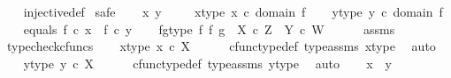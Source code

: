 \begin{isabellebody}
%
\isadelimproof
\ \ %
\endisadelimproof
%
\isatagproof
{}\isamarkupfalse%
\ injective{\isacharunderscore}{\kern0pt}def\isanewline
{}\isamarkupfalse%
\ safe\isanewline
\ \ \isamarkupfalse%
\ x\ y\ \isanewline
\ \ \isamarkupfalse%
\ x{\isacharunderscore}{\kern0pt}type{\isacharcolon}{\kern0pt}\ {\isachardoublequoteopen}x\ {\isasymin}\isactrlsub c\ domain\ f{\isachardoublequoteclose}\isanewline
\ \ \isamarkupfalse%
\ y{\isacharunderscore}{\kern0pt}type{\isacharcolon}{\kern0pt}\ {\isachardoublequoteopen}y\ {\isasymin}\isactrlsub c\ domain\ f{\isachardoublequoteclose}\isanewline
\ \ \isamarkupfalse%
\ equals{\isacharcolon}{\kern0pt}\ {\isachardoublequoteopen}f\ {\isasymcirc}\isactrlsub c\ x\ {\isacharequal}{\kern0pt}\ f\ {\isasymcirc}\isactrlsub c\ y{\isachardoublequoteclose}\isanewline
\ \ \isamarkupfalse%
\ fg{\isacharunderscore}{\kern0pt}type{\isacharcolon}{\kern0pt}\ {\isachardoublequoteopen}f\ {\isasymtimes}\isactrlsub f\ g\ {\isacharcolon}{\kern0pt}\ X\ {\isasymtimes}\isactrlsub c\ Z\ {\isasymrightarrow}\ Y\ {\isasymtimes}\isactrlsub c\ W{\isachardoublequoteclose}\isanewline
\ \ \ \ \isamarkupfalse%
\ assms\ \isamarkupfalse%
\ typecheck{\isacharunderscore}{\kern0pt}cfuncs\isanewline
\ \ \isamarkupfalse%
\ x{\isacharunderscore}{\kern0pt}type{}{\isacharcolon}{\kern0pt}\ {\isachardoublequoteopen}x\ {\isasymin}\isactrlsub c\ X{\isachardoublequoteclose}\isanewline
\ \ \ \ \isamarkupfalse%
\ cfunc{\isacharunderscore}{\kern0pt}type{\isacharunderscore}{\kern0pt}def\ type{\isacharunderscore}{\kern0pt}assms{\isacharparenleft}{\kern0pt}{}{\isacharparenright}{\kern0pt}\ x{\isacharunderscore}{\kern0pt}type\ \isamarkupfalse%
\ auto\isanewline
\ \ \isamarkupfalse%
\ y{\isacharunderscore}{\kern0pt}type{}{\isacharcolon}{\kern0pt}\ {\isachardoublequoteopen}y\ {\isasymin}\isactrlsub c\ X{\isachardoublequoteclose}\isanewline
\ \ \ \ \isamarkupfalse%
\ cfunc{\isacharunderscore}{\kern0pt}type{\isacharunderscore}{\kern0pt}def\ type{\isacharunderscore}{\kern0pt}assms{\isacharparenleft}{\kern0pt}{}{\isacharparenright}{\kern0pt}\ y{\isacharunderscore}{\kern0pt}type\ \isamarkupfalse%
\ auto\isanewline
\ \ \isamarkupfalse%
\ {\isachardoublequoteopen}x\ {\isacharequal}{\kern0pt}\ y{\isachardoublequoteclose}\isanewline
\ \ \isamarkupfalse%
\ {\isacharminus}{\kern0pt}\ \isanewline

\end{isabellebody}
